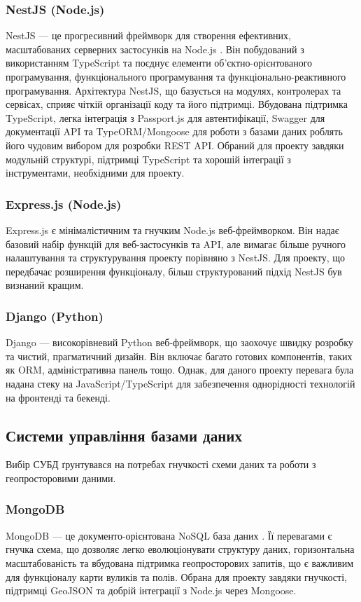\subsubsection{NestJS (Node.js)}
NestJS — це прогресивний фреймворк для створення ефективних, масштабованих серверних застосунків на Node.js \cite{nestjs}. Він побудований з використанням TypeScript та поєднує елементи об'єктно-орієнтованого програмування, функціонального програмування та функціонально-реактивного програмування. Архітектура NestJS, що базується на модулях, контролерах та сервісах, сприяє чіткій організації коду та його підтримці. Вбудована підтримка TypeScript, легка інтеграція з Passport.js для автентифікації, Swagger для документації API та TypeORM/Mongoose для роботи з базами даних роблять його чудовим вибором для розробки REST API. Обраний для проекту завдяки модульній структурі, підтримці TypeScript та хорошій інтеграції з інструментами, необхідними для проекту.

\subsubsection{Express.js (Node.js)}
Express.js є мінімалістичним та гнучким Node.js веб-фреймворком. Він надає базовий набір функцій для веб-застосунків та API, але вимагає більше ручного налаштування та структурування проекту порівняно з NestJS. Для проекту, що передбачає розширення функціоналу, більш структурований підхід NestJS був визнаний кращим.

\subsubsection{Django (Python)}
Django — високорівневий Python веб-фреймворк, що заохочує швидку розробку та чистий, прагматичний дизайн. Він включає багато готових компонентів, таких як ORM, адміністративна панель тощо. Однак, для даного проекту перевага була надана стеку на JavaScript/TypeScript для забезпечення однорідності технологій на фронтенді та бекенді.

\subsection{Системи управління базами даних}
Вибір СУБД ґрунтувався на потребах гнучкості схеми даних та роботи з геопросторовими даними.
\subsubsection{MongoDB}
MongoDB — це документо-орієнтована NoSQL база даних \cite{mongodb}. Її перевагами є гнучка схема, що дозволяє легко еволюціонувати структуру даних, горизонтальна масштабованість та вбудована підтримка геопросторових запитів, що є важливим для функціоналу карти вуликів та полів. Обрана для проекту завдяки гнучкості, підтримці GeoJSON та добрій інтеграції з Node.js через Mongoose.

